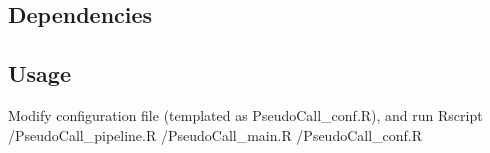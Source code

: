 \documentclass[11pt]{article}
\begin{document}
\begin{sloppypar}
\subsection{Dependencies}
\subsection{Usage}
Modify configuration file (templated as PseudoCall\_conf.R), and run \newline
Rscript /PseudoCall\_pipeline.R /PseudoCall\_main.R /PseudoCall\_conf.R



\printbibliography
\end{sloppypar}
\end{document}
